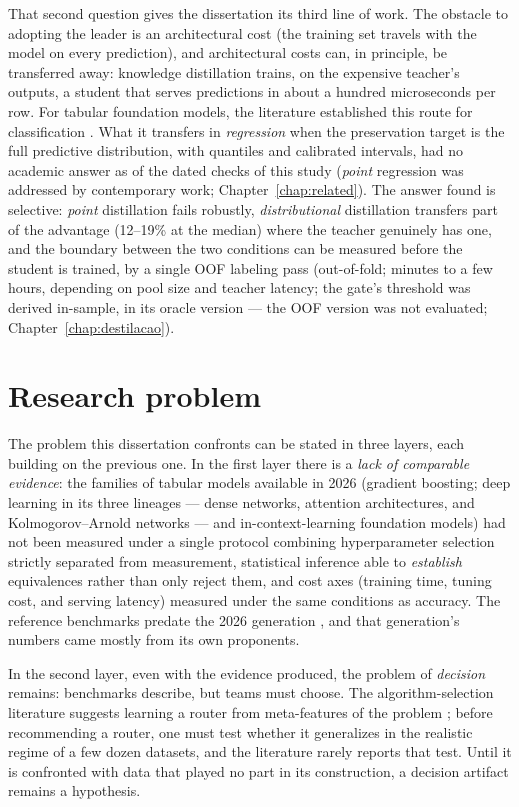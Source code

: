 That second question gives the dissertation its third line of work.
The obstacle to adopting the leader is an architectural cost (the
training set travels with the model on every prediction), and
architectural costs can, in principle, be transferred away: knowledge
distillation \citep{hinton2015} trains, on the expensive teacher's
outputs, a student that serves predictions in about a hundred
microseconds per row. For tabular foundation models, the literature established this
route for classification \citep{pocketfm2026}. What it transfers in
\emph{regression} when the preservation target is the
full predictive distribution, with quantiles and calibrated
intervals, had no academic answer as of the dated checks of this
study (\emph{point} regression was addressed by contemporary work;
Chapter~\ref{chap:related}). The answer found is selective: \emph{point}
distillation fails robustly, \emph{distributional} distillation
transfers part of the advantage (12--19\% at the median) where the
teacher genuinely has one, and the boundary between
the two conditions can be measured before the student is trained, by
a single OOF labeling pass (out-of-fold; minutes to a few hours,
depending on
pool size and teacher latency; the gate's threshold was derived
in-sample, in its oracle version --- the OOF version was not
evaluated;
Chapter~\ref{chap:destilacao}).

\section{Research problem}
\label{sec:intro-problema}

The problem this dissertation confronts can be stated in three layers,
each building on the previous one. In the first layer there is a
\emph{lack of comparable evidence}: the families of tabular models
available in 2026 (gradient boosting; deep learning in its three
lineages --- dense networks, attention architectures, and
Kolmogorov--Arnold networks --- and in-context-learning foundation
models) had not been measured under a single protocol combining
hyperparameter selection strictly separated from measurement,
statistical inference able to \emph{establish} equivalences rather than
only reject them, and cost axes (training time, tuning cost, and
serving latency) measured under the same conditions as accuracy. The
reference benchmarks predate the 2026 generation
\citep{grinsztajn2022,mcelfresh2023}, and that generation's numbers
came mostly from its own proponents.

In the second layer, even with the evidence produced, the problem of
\emph{decision} remains: benchmarks describe, but teams must choose.
The algorithm-selection literature suggests learning a router from
meta-features of the problem \citep{rice1976}; before recommending a
router, one must test whether it generalizes in the realistic regime
of a few dozen datasets, and the literature rarely reports that test.
Until it is confronted with data that played no part in its
construction, a decision artifact remains a hypothesis.

